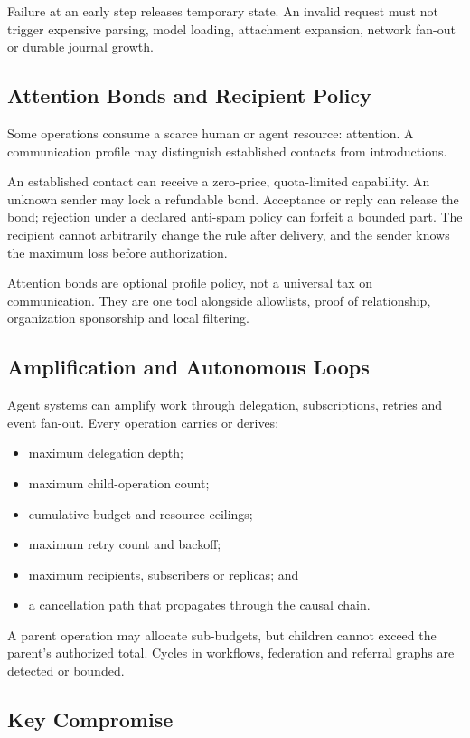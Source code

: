 \documentclass[11pt,oneside]{article}
\begin{document}
Failure at an early step releases temporary state. An invalid request must not trigger
expensive parsing, model loading, attachment expansion, network fan-out or durable journal
growth.

\subsection{Attention Bonds and Recipient Policy}

Some operations consume a scarce human or agent resource: attention. A communication profile
may distinguish established contacts from introductions.

An established contact can receive a zero-price, quota-limited capability. An unknown sender
may lock a refundable bond. Acceptance or reply can release the bond; rejection under a
declared anti-spam policy can forfeit a bounded part. The recipient cannot arbitrarily change
the rule after delivery, and the sender knows the maximum loss before authorization.

Attention bonds are optional profile policy, not a universal tax on communication. They are
one tool alongside allowlists, proof of relationship, organization sponsorship and local
filtering.

\subsection{Amplification and Autonomous Loops}

Agent systems can amplify work through delegation, subscriptions, retries and event fan-out.
Every operation carries or derives:

\begin{itemize}
  \item maximum delegation depth;
  \item maximum child-operation count;
  \item cumulative budget and resource ceilings;
  \item maximum retry count and backoff;
  \item maximum recipients, subscribers or replicas; and
  \item a cancellation path that propagates through the causal chain.
\end{itemize}

A parent operation may allocate sub-budgets, but children cannot exceed the parent's
authorized total. Cycles in workflows, federation and referral graphs are detected or bounded.
\subsection{Key Compromise}
\end{document}
